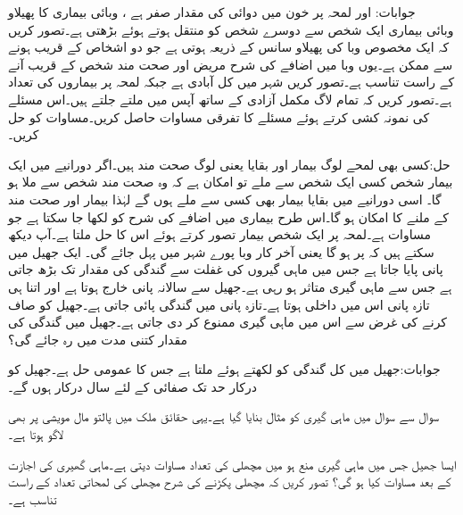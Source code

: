 جوابات: اور لمحہ  پر خون میں دوائی کی مقدار صفر ہے ، 
\quad وبائی بیماری کا پھیلاو\\
وبائی بیماری ایک شخص سے دوسرے شخص کو منتقل ہوتے ہوئے بڑھتی ہے۔تصور کریں کہ ایک مخصوص وبا کی پھیلاو سانس کے ذریعہ ہوتی ہے جو دو اشخاص کے قریب ہونے سے ممکن ہے۔یوں وبا میں اضافے کی شرح مریض اور صحت مند شخص کے قریب آنے کے راست تناسب ہے۔تصور کریں شہر میں کل آبادی  ہے جبکہ لمحہ  پر بیماروں کی تعداد  ہے۔تصور کریں کہ تمام لاگ مکمل آزادی کے ساتھ آپس میں ملتے جلتے ہیں۔اس مسئلے کی نمونہ کشی کرتے ہوئے مسئلے کا تفرقی مساوات حاصل کریں۔مساوات کو حل کریں۔
 
حل:کسی بھی لمحے  لوگ بیمار اور بقایا یعنی  لوگ صحت مند ہیں۔اگر  دورانیے میں ایک بیمار شخص کسی ایک شخص سے ملے تو  امکان ہے کہ وہ صحت مند شخص سے ملا ہو گا۔ اسی دورانیے میں بقایا بیمار بھی کسی سے ملے ہوں گے لہٰذا بیمار اور صحت مند کے ملنے کا امکان    ہو گا۔اس طرح  بیماری میں اضافے کی شرح  کو  لکھا جا سکتا ہے جو مساوات  ہے۔لمحہ  پر ایک شخص بیمار تصور کرتے ہوئے  اس کا  حل
  ملتا ہے۔آپ دیکھ سکتے ہیں کہ  پر  ہو گا یعنی آخر کار وبا پورے شہر میں پہل جائے گی۔
ایک جھیل میں  پانی پایا جاتا ہے جس میں ماہی گیروں کی غفلت سے گندگی کی مقدار   تک بڑھ جاتی ہے جس سے  ماہی گیری  متاثر ہو رہی ہے۔جھیل سے سالانہ   پانی خارج ہوتا ہے اور اتنا ہی تازہ پانی اس میں داخلی ہوتا ہے۔تازہ پانی میں  گندگی پائی جاتی ہے۔جھیل کو صاف کرنے کی غرض سے اس میں ماہی گیری ممنوع کر دی جاتی ہے۔جھیل میں گندگی کی مقدار کتنی مدت میں  رہ جائے گی؟

جوابات:جھیل میں کل گندگی کو  لکھتے ہوئے  ملتا ہے جس کا عمومی حل  ہے۔جھیل کو درکار حد تک صفائی کے لئے  سال درکار ہوں گے۔

سوال  سے سوال  میں ماہی گیری کو مثال بنایا گیا ہے۔یہی حقائق ملک میں پالتو مال مویشی  پر بھی لاگو ہوتا ہے۔

ایسا جھیل جس میں ماہی گیری منع ہو میں مچھلی کی تعداد مساوات  دیتی ہے۔ماہی گھیری کی اجازت کے بعد مساوات کیا ہو گی؟ تصور  کریں کہ مچھلی پکڑنے کی شرح مچھلی کی لمحاتی تعداد کے راست تناسب ہے۔

